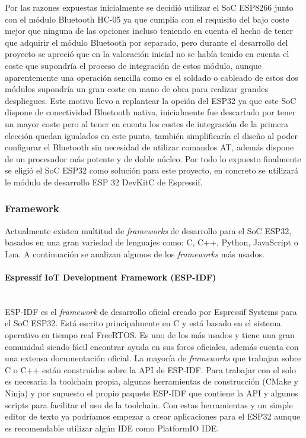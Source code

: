 \documentclass[../proyecto.tex]{subfiles}
\begin{document}
Por las razones expuestas inicialmente se decidió utilizar el SoC ESP8266 junto con el módulo Bluetooth HC-05 ya que cumplía con el requisito del bajo coste mejor que ninguna de las opciones incluso teniendo en cuenta el hecho de tener que adquirir el módulo Bluetooth por separado, pero durante el desarrollo del proyecto se apreció que en la valoración inicial no se había tenido en cuenta el coste que supondría el proceso de integración de estos módulo, aunque aparentemente una operación sencilla como es el soldado o cableado de estos dos módulos supondría un gran coste en mano de obra para realizar grandes despliegues. Este motivo llevo a replantear la opción del ESP32 ya que este SoC dispone de conectividad Bluetooth nativa, inicialmente fue descartado por tener un mayor coste pero al tener en cuenta los costes de integración de la primera elección quedan igualados en este punto, también simplificaría el diseño al poder configurar el Bluetooth sin necesidad de utilizar comandos AT, además dispone de un procesador más potente y de doble núcleo. Por todo lo expuesto finalmente se eligió el SoC ESP32 como solución para este proyecto, en concreto se utilizará le módulo de desarrollo ESP 32 DevKitC de Espressif.\\

\subsubsection{Framework}

Actualmente existen multitud de \textit{frameworks} de desarrollo para el SoC ESP32, basados en una gran variedad de lenguajes como: C, C++, Python, JavaScript o Lua. A continuación se analizan algunos de los  \textit{frameworks} más usados.\\

\paragraph{Espressif IoT Development Framework (ESP-IDF)}\mbox{}\\
ESP-IDF es el \textit{framework} de desarrollo oficial creado por Espressif Systems para el SoC ESP32. Está escrito principalmente en C  y está basado en el sistema operativo en tiempo real FreeRTOS. Es uno de los más usados y tiene una gran comunidad siendo fácil encontrar ayuda en sus foros oficiales, además cuenta con una extensa documentación oficial. La mayoría de \textit{frameworks} que trabajan sobre C o C++ están construidos sobre la API de ESP-IDF. Para trabajar con el solo es necesaria la toolchain propia, algunas herramientas de construcción (CMake y Ninja) y por supuesto el propio paquete ESP-IDF que contiene la API y algunos scripts para facilitar el uso de la toolchain. Con estas herramientas y un simple editor de texto ya podríamos empezar a crear aplicaciones para el ESP32 aunque es recomendable utilizar algún IDE como PlatformIO IDE.\\
\end{document}
